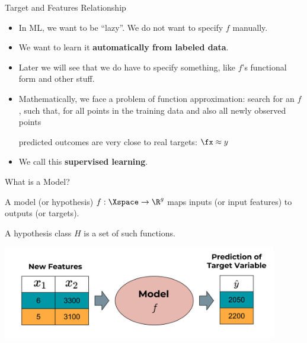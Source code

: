 \begin{frame}{Target and Features Relationship}

\begin{itemize}
\item
  In ML, we want to be \enquote{lazy}. We do not want to specify \(f\)
  manually.
\item
  We want to learn it \textbf{automatically from labeled data}.
\item
  Later we will see that we do have to specify something, like \(f\)'s
  functional form and other stuff.
\item
  Mathematically, we face a problem of function approximation: search
  for an \(f\), such that, for all points in the training data and also
  all newly observed points

\begin{center}
\end{center}

  predicted outcomes are very close to real targets: $\fx \approx y$

\end{itemize}

\begin{itemize}

\item
  We call this \textbf{supervised learning}.
\end{itemize}

\end{frame}

\begin{frame}{What is a Model?}


A model (or hypothesis) $f : \Xspace \rightarrow \R^g$ maps inputs (or input features) to outputs (or targets).

A hypothesis class $H$ is a set of such functions.

\scriptsize

\begin{center}\includegraphics[width=0.9\textwidth]{plots/the_model_web} \end{center}

\normalsize 

\end{frame}

